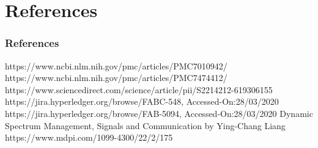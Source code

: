 \documentclass[english,hangout]{beamer}
\begin{document}
\section{References}

\begin{frame}
\frametitle{References}
\begin{thebibliography}{00}

 https://www.ncbi.nlm.nih.gov/pmc/articles/PMC7010942/
 https://www.ncbi.nlm.nih.gov/pmc/articles/PMC7474412/
 https://www.sciencedirect.com/science/article/pii/S2214212-619306155
 https://jira.hyperledger.org/browse/FABC-548, Accessed-On:28/03/2020
 https://jira.hyperledger.org/browse/FAB-5094, Accessed-On:28/03/2020
 Dynamic Spectrum Management, Signals and Communication by Ying-Chang Liang
 https://www.mdpi.com/1099-4300/22/2/175

\end{thebibliography}

\end{frame}
\end{document}
